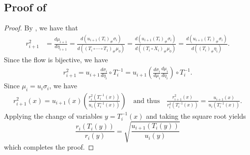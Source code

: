 \documentclass[11pt]{article}
\begin{document}
\subsection{Proof of } \label{sec: proof of radial update}
\begin{proof}
    By , we have that
    \begin{align*}
    r_{i+1}^2 &= \frac{d\mu_{i+1}}{d\eta_{i+1}} = \frac{d(u_{i+1}(T_i)_\#\sigma_i)}{d((T_{i}\circ \cdots \circ T_1)_\#\mu_0)} = \frac{d(u_{i+1}(T_i)_\#\sigma_i)}{d((T_{i}\circ X_i)_\#\mu_0)} = \frac{d(u_{i+1}(T_i)_\#\sigma_i)}{d((T_{i})_\#\eta_i)}.
    \end{align*}
    Since the flow is bijective, we have
    \begin{align*}
        r_{i+1}^2 = u_{i+1}\frac{d\sigma_i}{d\eta_i} \circ T_i^{-1} = u_{i+1}\left(\frac{d\sigma_i}{d\mu_i}\frac{d\mu_i}{d\eta_i}\right)\circ T_{i}^{-1}.
    \end{align*}
    Since $\mu_i = u_i \sigma_i$, we have
    \begin{align*}
        r_{i+1}^2(x) = u_{i+1}(x)\left(\frac{r_i^2(T_i^{-1}(x))}{u_i(T_i^{-1}(x))}\right) \quad \text{and thus} \quad \frac{r_{i+1}^2(x)}{r_i^2(T_i^{-1}(x))} = \frac{u_{i+1}(x)}{u_i(T_i^{-1}(x))}.
    \end{align*}
    Applying the change of variables $y = T_i^{-1}(x)$ and taking the square root yields
    \[\frac{r_i(T_i(y))}{r_i(y)} = \sqrt{\frac{u_{i+1}(T_i(y))}{u_i(y)}}\]
    which completes the proof.
\end{proof}
\end{document}
